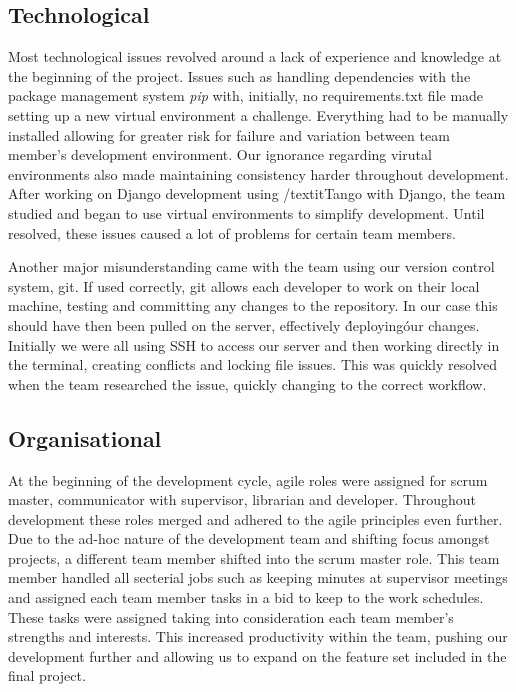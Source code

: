 \documentclass{l3proj}
\begin{document}
\subsection{Technological}
Most technological issues revolved around a lack of experience and knowledge at
the beginning of the project. Issues such as handling dependencies with the package management system \textit{pip} with, initially, no requirements.txt file made setting up a new virtual environment a challenge. Everything had to be manually installed allowing for greater risk for failure and variation between team member's development environment. Our ignorance regarding virutal environments also made maintaining consistency harder throughout development. After working on Django development using /textit{Tango with Django}, the team studied and began to use virtual environments to simplify development. Until resolved, these issues caused a lot of problems for certain team members.

Another major misunderstanding came with the team using our version control system, git. If used correctly, git allows each developer to work on their local machine, testing and committing any changes to the repository. In our case this should have then been pulled on the server, effectively \'deploying\' our changes. Initially we were all using SSH to access our server and then working directly in the terminal, creating conflicts and locking file issues. This was quickly resolved when the team researched the issue, quickly changing to the correct workflow.

\subsection{Organisational}    At the beginning of the development cycle, agile roles were assigned for scrum master, communicator with supervisor, librarian and developer. Throughout development these roles merged and adhered to the agile principles even further. Due to the ad-hoc nature of the development team and shifting focus amongst projects, a different team member shifted into the scrum master role. This team member handled all secterial jobs such as keeping minutes at supervisor meetings and assigned each team member tasks in a bid to keep to the work schedules. These tasks were assigned taking into consideration each team member’s strengths and interests. This increased productivity within the team, pushing our development further and allowing us to expand on the feature set included in the final project.
\end{document}
